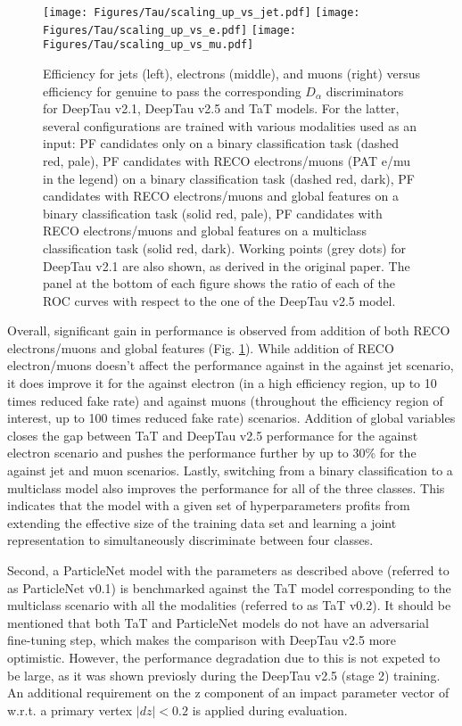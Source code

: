 \begin{figure}[ht!]
    \centering
    \texttt{[image: Figures/Tau/scaling\_up\_vs\_jet.pdf]}
    \texttt{[image: Figures/Tau/scaling\_up\_vs\_e.pdf]}
    \texttt{[image: Figures/Tau/scaling\_up\_vs\_mu.pdf]}
    \caption{Efficiency for jets (left), electrons (middle), and muons (right) versus efficiency for genuine \tauh to pass the corresponding $D_\alpha$ discriminators for DeepTau v2.1, DeepTau v2.5 and TaT models. For the latter, several configurations are trained with various modalities used as an input: PF candidates only on a binary classification task (dashed red, pale), PF candidates with RECO electrons/muons (PAT e/mu in the legend) on a binary classification task (dashed red, dark), PF candidates with RECO electrons/muons and global features on a binary classification task (solid red, pale), PF candidates with RECO electrons/muons and global features on a multiclass classification task (solid red, dark). Working points (grey dots) for DeepTau v2.1 are also shown, as derived in the original paper. The panel at the bottom of each figure shows the ratio of each of the ROC curves with respect to the one of the DeepTau v2.5 model.}
    \label{fig:tat_modalities}
\end{figure}

Overall, significant gain in performance is observed from addition of both RECO electrons/muons and global features (Fig. \ref{fig:tat_modalities}). While addition of RECO electron/muons doesn't affect the performance against in the \tauh against jet scenario, it does improve it for the \tauh against electron (in a high \tauh efficiency region, up to 10 times reduced fake rate) and against muons (throughout the \tauh efficiency region of interest, up to 100 times reduced fake rate) scenarios. Addition of global variables closes the gap between TaT and DeepTau v2.5 performance for the against electron scenario and pushes the performance further by up to 30\% for the against jet and muon scenarios. Lastly, switching from a binary classification to a multiclass model also improves the performance for all of the three classes. This indicates that the model with a given set of hyperparameters profits from extending the effective size of the training data set and learning a joint representation to simultaneously discriminate between four classes.

Second, a ParticleNet model with the parameters as described above (referred to as ParticleNet v0.1) is benchmarked against the TaT model corresponding to the multiclass scenario with all the modalities (referred to as TaT v0.2). It should be mentioned that both TaT and ParticleNet models do not have an adversarial fine-tuning step, which makes the comparison with DeepTau v2.5 more optimistic. However, the performance degradation due to this is not expeted to be large, as it was shown previosly during the DeepTau v2.5 (stage 2) training. An additional requirement on the z component of an impact parameter vector of \tauh w.r.t. a primary vertex $|dz| < 0.2$ is applied during evaluation. 

